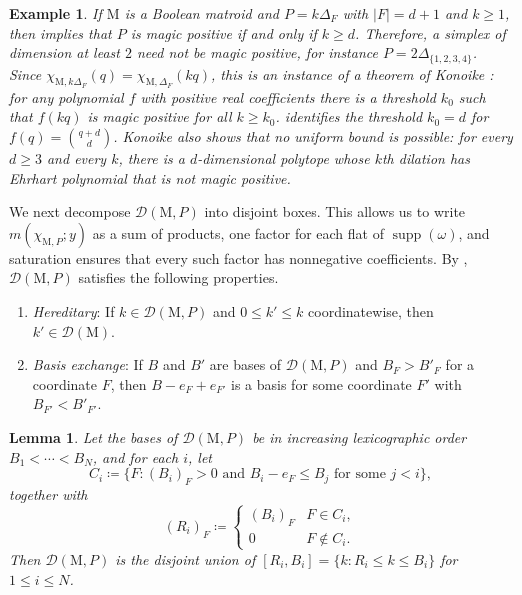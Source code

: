 \documentclass[11pt,a4paper,reqno]{amsart}
\theoremstyle{results}
\newtheorem{lemma}[thm]{Lemma}
\theoremstyle{definitions}
\newtheorem{example}[thm]{Example}
\newcommand{\M}{\mathrm{M}}
\DeclareMathOperator{\supp}{supp}
\newcommand{\DHR}{\mathcal{D}}
\begin{document}
\begin{example}
  If $\M$ is a Boolean matroid and $P=k\Delta_F$ with $|F|=d+1$ and $k\geqslant1$,
  then  implies that $P$ is magic positive if and only if
  $k\geqslant d$. Therefore, a simplex of dimension at least $2$ need not be
  magic positive, for instance $P = 2\Delta_{\{1,2,3,4\}}$.
  Since $\chi_{\M,k\Delta_F}(q)=\chi_{\M,\Delta_F}(kq)$, this is an instance of a
  theorem of Konoike \cite{konoike2025magic}: for any polynomial $f$ with positive
  real coefficients there is a threshold $k_0$ such that $f(kq)$ is magic positive
  for all $k\geqslant k_0$.   identifies the threshold
  $k_0=d$ for $f(q)=\binom{q+d}{d}$.  Konoike also shows that no uniform bound is
  possible: for every $d\geqslant3$ and every $k$, there is a $d$-dimensional
  polytope whose $k$th dilation has Ehrhart polynomial that is not magic positive.
\end{example}

We next decompose $\DHR(\M, P)$ into
disjoint boxes. This allows us to write
$m(\chi_{\M,P}; y)$ as a sum of products, one factor for each flat of $\supp(\omega)$, and saturation ensures that every such factor has nonnegative coefficients.
By \cite{herzog2002discrete}, $\DHR(\M, P)$ satisfies the following properties. 
\begin{enumerate}[leftmargin=20pt]
    \item \emph{Hereditary}: If $k \in \DHR(\M, P)$ and
      $0 \leqslant k' \leqslant k$ coordinatewise, then $k' \in \DHR(\M)$.
    \item \emph{Basis exchange}: If $B$ and $B'$ are bases of $\DHR(\M, P)$ and
      $B_F > B'_F$ for a coordinate $F$, then $B - e_F + e_{F'}$ is a basis for some
      coordinate $F'$ with $B_{F'} < B'_{F'}$.
\end{enumerate}

\begin{lemma}\label{lem:lex-shelling}
  Let the bases of $\DHR(\M, P)$ be in increasing lexicographic order
  $B_1 < \cdots < B_N$, and for each $i$, let
  \[
    C_i \coloneqq \big\{ F : (B_i)_F > 0 \text{ and } B_i - e_F \leqslant B_j \text{ for some } j < i \big\},
  \]
  together with
  \[
    (R_i)_F \coloneqq \begin{cases} (B_i)_F & F \in C_i, \\ 0 & F \notin C_i. \end{cases}
  \]
  Then $\DHR(\M, P)$ is the disjoint union of
  $[R_i, B_i] = \{k : R_i \leqslant k \leqslant B_i\}$ for $1 \leqslant i \leqslant N$.
\end{lemma}
\end{document}
